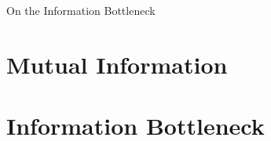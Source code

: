 \documentclass[11pt]{article}
\begin{document}
	
\begin{center}
{\LARGE On the Information Bottleneck} 
\end{center}

\begin{abstract}
The Information Bottleneck (IB) formalizes the notion of a ``good'' representation in terms of the fundamental tradeoff between having a concise representation and one with good predictive power. It was introduced by Naftali Tishby et al. in 1999 and appears to be fundamental to a deep understanding of representations. We draw connections to (1) minimal sufficient statistics, (2) the formulation of variational auto-encoders, and (3) the topology of deep neural networks.
\end{abstract}

\section{Mutual Information}


\section{Information Bottleneck}

\end{document}
